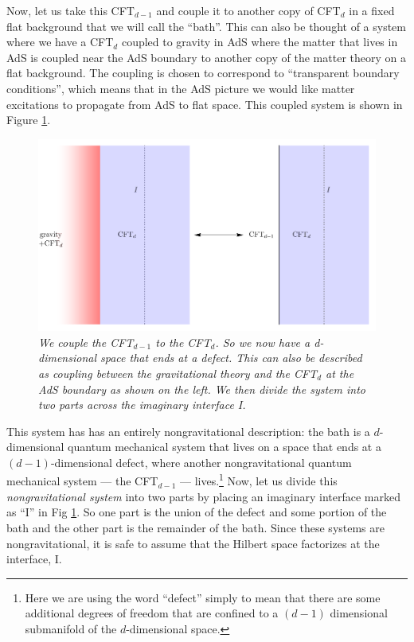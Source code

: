 \documentclass[12pt]{article}
\begin{document}
Now, let us take this CFT$_{d-1}$ and couple it to another copy of CFT$_d$ in a fixed flat background that we will call the ``bath''. This can also be
thought of a system where we have a CFT$_d$ coupled to gravity in AdS where the matter that lives in AdS is coupled near the AdS boundary to another copy of the matter theory on a
flat background. The coupling is chosen to correspond to ``transparent boundary conditions'', which means that in the AdS picture we would like  matter excitations to propagate from AdS to flat space. This coupled system is shown in Figure \ref{figholographiccoupled}.
\begin{figure}[!ht]
\begin{center}
\includegraphics[height=0.4\textheight]{sysbathcoupling.pdf}
\caption{\em We couple the CFT$_{d-1}$ to the CFT$_d$. So we now have a d-dimensional space that ends at a defect. This can also be described as coupling between the gravitational theory and the CFT$_d$ at the AdS boundary as shown on the left. We then divide the system into two parts across the imaginary interface I. \label{figholographiccoupled}}
\end{center}
\end{figure}

This system has  has an entirely nongravitational description: the bath is a  $d$-dimensional quantum mechanical system that lives on a space that ends at a $(d-1)$-dimensional defect, where another nongravitational quantum mechanical system --- the CFT$_{d-1}$ --- lives.\footnote{Here we are using the word ``defect'' simply to mean that there are some additional degrees of freedom that are confined to a $(d-1)$ dimensional submanifold of the $d$-dimensional space.}
Now, let us divide this {\em nongravitational system} into two parts by placing an imaginary interface marked as ``I'' in  Fig \ref{figholographiccoupled}. So one part is the  union of the defect and some portion of the bath and the other part is the remainder of the bath.  Since these systems are nongravitational, it is safe to assume that the Hilbert space factorizes at the interface, I.
\end{document}
